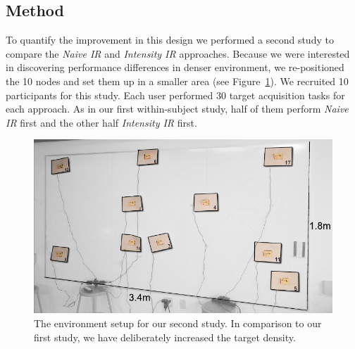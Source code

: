 \subsection{Method}
To quantify the improvement in this design we performed a second study to compare the {\em Naive IR} and {\em Intensity IR} approaches. Because we were interested in discovering performance differences in denser environment, we re-positioned the 10 nodes and set them up in a smaller area (see Figure~\ref{fig:study-layout2}). We recruited 10 participants for this study. Each  user performed 30 target acquisition tasks for each approach. As in our first within-subject study, half of them perform {\em Naive IR} first and the other half {\em Intensity IR} first.

\begin{figure}[t]
\centering
\includegraphics[width=0.95\columnwidth]{figures/study-layout2.pdf}
\caption{The environment setup for our second study. In comparison to our first study, we have deliberately increased the target density.}
\label{fig:study-layout2}
\end{figure}








